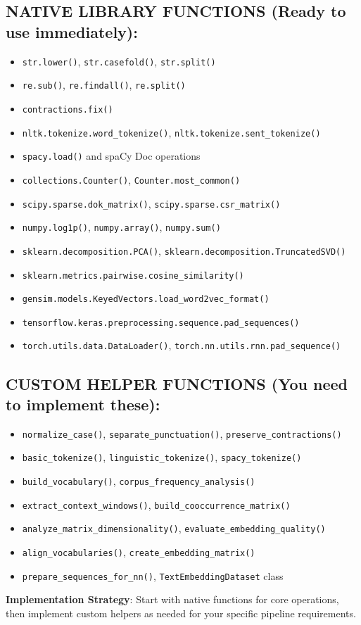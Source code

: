 \documentclass[11pt,a4paper]{article}
\begin{document}
\subsection{\textcolor{nativecolor}{NATIVE LIBRARY FUNCTIONS} (Ready to use immediately):}
\begin{itemize}
\item \texttt{str.lower()}, \texttt{str.casefold()}, \texttt{str.split()}
\item \texttt{re.sub()}, \texttt{re.findall()}, \texttt{re.split()}
\item \texttt{contractions.fix()}
\item \texttt{nltk.tokenize.word\_tokenize()}, \texttt{nltk.tokenize.sent\_tokenize()}
\item \texttt{spacy.load()} and spaCy Doc operations
\item \texttt{collections.Counter()}, \texttt{Counter.most\_common()}
\item \texttt{scipy.sparse.dok\_matrix()}, \texttt{scipy.sparse.csr\_matrix()}
\item \texttt{numpy.log1p()}, \texttt{numpy.array()}, \texttt{numpy.sum()}
\item \texttt{sklearn.decomposition.PCA()}, \texttt{sklearn.decomposition.TruncatedSVD()}
\item \texttt{sklearn.metrics.pairwise.cosine\_similarity()}
\item \texttt{gensim.models.KeyedVectors.load\_word2vec\_format()}
\item \texttt{tensorflow.keras.preprocessing.sequence.pad\_sequences()}
\item \texttt{torch.utils.data.DataLoader()}, \texttt{torch.nn.utils.rnn.pad\_sequence()}
\end{itemize}

\subsection{\textcolor{customcolor}{CUSTOM HELPER FUNCTIONS} (You need to implement these):}
\begin{itemize}
\item \texttt{normalize\_case()}, \texttt{separate\_punctuation()}, \texttt{preserve\_contractions()}
\item \texttt{basic\_tokenize()}, \texttt{linguistic\_tokenize()}, \texttt{spacy\_tokenize()}
\item \texttt{build\_vocabulary()}, \texttt{corpus\_frequency\_analysis()}
\item \texttt{extract\_context\_windows()}, \texttt{build\_cooccurrence\_matrix()}
\item \texttt{analyze\_matrix\_dimensionality()}, \texttt{evaluate\_embedding\_quality()}
\item \texttt{align\_vocabularies()}, \texttt{create\_embedding\_matrix()}
\item \texttt{prepare\_sequences\_for\_nn()}, \texttt{TextEmbeddingDataset} class
\end{itemize}

\textbf{Implementation Strategy}: Start with native functions for core operations, then implement custom helpers as needed for your specific pipeline requirements.
\end{document}
